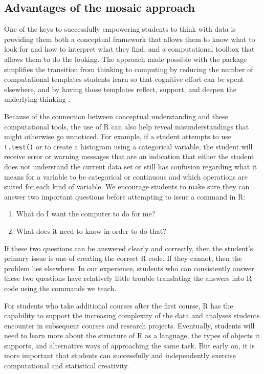 \subsection{Advantages of the mosaic
approach}\label{advantages-of-the-mosaic-approach}

One of the keys to successfully empowering students to think with data
is providing them both a conceptual framework that allows them to know
what to look for and how to interpret what they find, and a
computational toolbox that allows them to do the looking. The approach
made possible with the  package simplifies the transition
from thinking to computing by reducing the number of computational
templates students learn so that cognitive effort can be spent
elsewhere, and by having those templates reflect, support, and deepen
the underlying thinking \citep{Grolemund:ISR:2014}.

Because of the connection between conceptual understanding and these
computational tools, the use of R can also help reveal misunderstandings
that might otherwise go unnoticed. For example, if a student attempts to
use \texttt{t.test()} or to create a histogram using a categorical
variable, the student will receive error or warning messages that are an
indication that either the student does not understand the current data
set or still has confusion regarding what it means for a variable to be
categorical or continuous and which operations are suited for each kind
of variable. We encourage students to make sure they can answer two
important questions before attempting to issue a command in R:

\begin{enumerate}
\def\labelenumi{\arabic{enumi}.}
\item
  What do I want the computer to do for me?
\item
  What does it need to know in order to do that?
\end{enumerate}

If these two questions can be answered clearly and correctly, then the
student's primary issue is one of creating the correct R code. If they
cannot, then the problem lies elsewhere. In our experience, students who
can consistently answer these two questions have relatively little
trouble translating the answers into R code using the commands we teach.

For students who take additional courses after the first course, R has
the capability to support the increasing complexity of the data and
analyses students encounter in subsequent courses and research projects.
Eventually, students will need to learn more about the structure of R as
a language, the types of objects it supports, and alternative ways of
approaching the same task. But early on, it is more important that
students can successfully and independently exercise computational and
statistical creativity.

